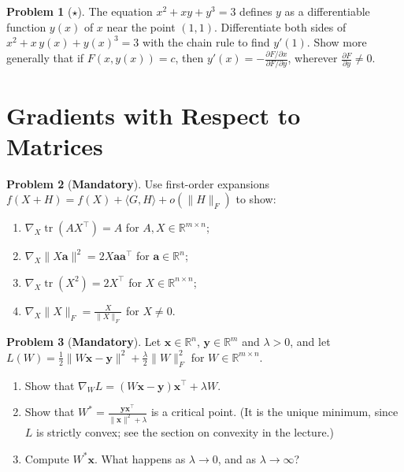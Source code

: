 \documentclass[11pt]{article}
\theoremstyle{definition}
\newtheorem{problem}{Problem}[section]
\newcommand{\mandatory}{\textcolor{red!70!black}{\textbf{Mandatory}}}
\newcommand{\norm}[1]{\lVert #1 \rVert}
\newcommand{\ip}[2]{\langle #1, #2 \rangle}
\DeclareMathOperator{\tr}{tr}
\begin{document}
\begin{problem}[$\star$]\label{pr:implicit}
    The equation $x^2 + xy + y^3 = 3$ defines $y$ as a differentiable function $y(x)$ of $x$ near the point $(1, 1)$. Differentiate both sides of $x^2 + x\,y(x) + y(x)^3 = 3$ with the chain rule to find $y'(1)$. Show more generally that if $F(x, y(x)) = c$, then $y'(x) = -\frac{\partial F/\partial x}{\partial F/\partial y}$, wherever $\frac{\partial F}{\partial y} \neq 0$.
\end{problem}

\section{Gradients with Respect to Matrices}

\begin{problem}[\mandatory]\label{pr:matrix-grads}
    Use first-order expansions $f(X + H) = f(X) + \ip{G}{H} + o(\norm{H}_F)$ to show:
    \begin{enumerate}[label=(\alph*)]
        \item $\nabla_X \tr(AX^\top) = A$ for $A, X \in \mathbb{R}^{m \times n}$;
        \item $\nabla_X \norm{X\mathbf{a}}^2 = 2X\mathbf{a}\mathbf{a}^\top$ for $\mathbf{a} \in \mathbb{R}^n$;
        \item $\nabla_X \tr(X^2) = 2X^\top$ for $X \in \mathbb{R}^{n \times n}$;
        \item $\nabla_X \norm{X}_F = \frac{X}{\norm{X}_F}$ for $X \neq 0$.
    \end{enumerate}
\end{problem}

\begin{problem}[\mandatory]\label{pr:regularized-layer}
    Let $\mathbf{x} \in \mathbb{R}^n$, $\mathbf{y} \in \mathbb{R}^m$ and $\lambda > 0$, and let $L(W) = \frac{1}{2}\norm{W\mathbf{x} - \mathbf{y}}^2 + \frac{\lambda}{2}\norm{W}_F^2$ for $W \in \mathbb{R}^{m \times n}$.
    \begin{enumerate}[label=(\alph*)]
        \item Show that $\nabla_W L = (W\mathbf{x} - \mathbf{y})\mathbf{x}^\top + \lambda W$.
        \item Show that $W^* = \frac{\mathbf{y}\mathbf{x}^\top}{\norm{\mathbf{x}}^2 + \lambda}$ is a critical point. (It is the unique minimum, since $L$ is strictly convex; see the section on convexity in the lecture.)
        \item Compute $W^*\mathbf{x}$. What happens as $\lambda \to 0$, and as $\lambda \to \infty$?
    \end{enumerate}
\end{problem}
\end{document}
